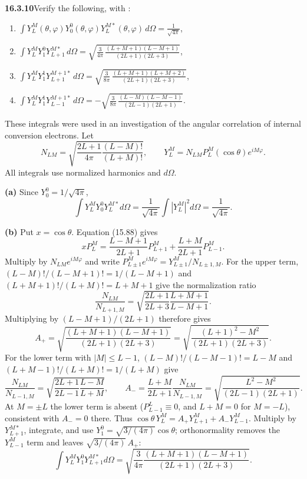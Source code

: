 \par\bigskip
\noindent\textbf{16.3.10}\quad Verify the following, with
:
\begin{enumerate}
\item[(a)] $\displaystyle\int
Y_{L}^{M}(\theta,\varphi)Y_{0}^{0}(\theta,\varphi)
Y_{L}^{M*}(\theta,\varphi)\,d\Omega=\frac{1}{\sqrt{4\pi}}$,
\item[(b)] $\displaystyle\int Y_{L}^{M}Y_{1}^{0}Y_{L+1}^{M*}\,d\Omega
=\sqrt{\frac{3}{4\pi}\,
\frac{(L+M+1)(L-M+1)}{(2L+1)(2L+3)}}$,
\item[(c)] $\displaystyle\int
Y_{L}^{M}Y_{1}^{1}Y_{L+1}^{M+1*}\,d\Omega
=\sqrt{\frac{3}{8\pi}\,
\frac{(L+M+1)(L+M+2)}{(2L+1)(2L+3)}}$,
\item[(d)] $\displaystyle\int
Y_{L}^{M}Y_{1}^{1}Y_{L-1}^{M+1*}\,d\Omega
=-\sqrt{\frac{3}{8\pi}\,
\frac{(L-M)(L-M-1)}{(2L-1)(2L+1)}}$.
\end{enumerate}
These integrals were used in an investigation of the angular
correlation of internal conversion electrons.
\solution
Let
\[
N_{LM}=\sqrt{\frac{2L+1}{4\pi}\frac{(L-M)!}{(L+M)!}},
\qquad Y_L^M=N_{LM}P_L^M(\cos\theta)e^{iM\varphi}.
\]
All integrals use normalized harmonics and $d\Omega$.

\textbf{(a)} Since $Y_0^0=1/\sqrt{4\pi}$,
\[
\int Y_L^MY_0^0Y_L^{M*}d\Omega
=\frac1{\sqrt{4\pi}}\int|Y_L^M|^2d\Omega
=\boxed{\frac1{\sqrt{4\pi}}}.
\]

\textbf{(b)} Put $x=\cos\theta$. Equation (15.88) gives
\[
xP_L^M=\frac{L-M+1}{2L+1}P_{L+1}^M+
\frac{L+M}{2L+1}P_{L-1}^M.
\]
Multiply by $N_{LM}e^{iM\varphi}$ and write
$P_{L\pm1}^Me^{iM\varphi}=Y_{L\pm1}^M/N_{L\pm1,M}$.
For the upper term, $(L-M)!/(L-M+1)!=1/(L-M+1)$ and
$(L+M+1)!/(L+M)!=L+M+1$ give the normalization ratio
\[
\frac{N_{LM}}{N_{L+1,M}}
=\sqrt{\frac{2L+1}{2L+3}\frac{L+M+1}{L-M+1}}.
\]
Multiplying by $(L-M+1)/(2L+1)$ therefore gives
\[
A_+=\sqrt{\frac{(L+M+1)(L-M+1)}{(2L+1)(2L+3)}}
=\sqrt{\frac{(L+1)^2-M^2}{(2L+1)(2L+3)}}.
\]
For the lower term with $|M|\le L-1$,
$(L-M)!/(L-M-1)!=L-M$ and $(L+M-1)!/(L+M)!=1/(L+M)$ give
\[
\frac{N_{LM}}{N_{L-1,M}}
=\sqrt{\frac{2L+1}{2L-1}\frac{L-M}{L+M}},
\qquad
A_-=\frac{L+M}{2L+1}\frac{N_{LM}}{N_{L-1,M}}
=\sqrt{\frac{L^2-M^2}{(2L-1)(2L+1)}}.
\]
At $M=\pm L$ the lower term is absent ($P_{L-1}^L\equiv0$, and
$L+M=0$ for $M=-L$), consistent with $A_-=0$ there.
Thus
$\cos\theta\,Y_L^M=A_+Y_{L+1}^M+A_-Y_{L-1}^M$.
Multiply by $Y_{L+1}^{M*}$, integrate, and use
$Y_1^0=\sqrt{3/(4\pi)}\cos\theta$; orthonormality removes the
$Y_{L-1}^M$ term and leaves $\sqrt{3/(4\pi)}\,A_+$:
\[
\boxed{\int Y_L^MY_1^0Y_{L+1}^{M*}d\Omega
=\sqrt{\frac3{4\pi}
\frac{(L+M+1)(L-M+1)}{(2L+1)(2L+3)}}}.
\]

